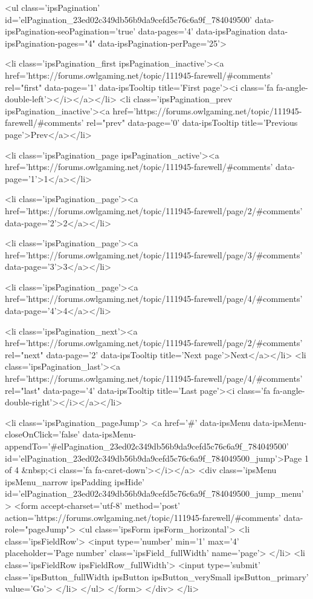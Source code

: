 	
	<ul class='ipsPagination' id='elPagination_23ed02c349db56b9da9cefd5c76c6a9f_784049500' data-ipsPagination-seoPagination='true' data-pages='4' data-ipsPagination  data-ipsPagination-pages="4" data-ipsPagination-perPage='25'>
		
			
				<li class='ipsPagination_first ipsPagination_inactive'><a href='https://forums.owlgaming.net/topic/111945-farewell/#comments' rel="first" data-page='1' data-ipsTooltip title='First page'><i class='fa fa-angle-double-left'></i></a></li>
				<li class='ipsPagination_prev ipsPagination_inactive'><a href='https://forums.owlgaming.net/topic/111945-farewell/#comments' rel="prev" data-page='0' data-ipsTooltip title='Previous page'>Prev</a></li>
			
			<li class='ipsPagination_page ipsPagination_active'><a href='https://forums.owlgaming.net/topic/111945-farewell/#comments' data-page='1'>1</a></li>
			
				
					<li class='ipsPagination_page'><a href='https://forums.owlgaming.net/topic/111945-farewell/page/2/#comments' data-page='2'>2</a></li>
				
					<li class='ipsPagination_page'><a href='https://forums.owlgaming.net/topic/111945-farewell/page/3/#comments' data-page='3'>3</a></li>
				
					<li class='ipsPagination_page'><a href='https://forums.owlgaming.net/topic/111945-farewell/page/4/#comments' data-page='4'>4</a></li>
				
				<li class='ipsPagination_next'><a href='https://forums.owlgaming.net/topic/111945-farewell/page/2/#comments' rel="next" data-page='2' data-ipsTooltip title='Next page'>Next</a></li>
				<li class='ipsPagination_last'><a href='https://forums.owlgaming.net/topic/111945-farewell/page/4/#comments' rel="last" data-page='4' data-ipsTooltip title='Last page'><i class='fa fa-angle-double-right'></i></a></li>
			
			
				<li class='ipsPagination_pageJump'>
					<a href='#' data-ipsMenu data-ipsMenu-closeOnClick='false' data-ipsMenu-appendTo='#elPagination_23ed02c349db56b9da9cefd5c76c6a9f_784049500' id='elPagination_23ed02c349db56b9da9cefd5c76c6a9f_784049500_jump'>Page 1 of 4 &nbsp;<i class='fa fa-caret-down'></i></a>
					<div class='ipsMenu ipsMenu_narrow ipsPadding ipsHide' id='elPagination_23ed02c349db56b9da9cefd5c76c6a9f_784049500_jump_menu'>
						<form accept-charset='utf-8' method='post' action='https://forums.owlgaming.net/topic/111945-farewell/#comments' data-role="pageJump">
							<ul class='ipsForm ipsForm_horizontal'>
								<li class='ipsFieldRow'>
									<input type='number' min='1' max='4' placeholder='Page number' class='ipsField_fullWidth' name='page'>
								</li>
								<li class='ipsFieldRow ipsFieldRow_fullWidth'>
									<input type='submit' class='ipsButton_fullWidth ipsButton ipsButton_verySmall ipsButton_primary' value='Go'>
								</li>
							</ul>
						</form>
					</div>
				</li>
			
